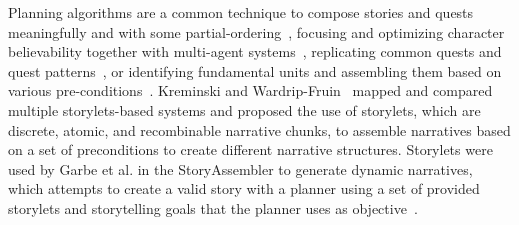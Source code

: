 Planning algorithms are a common technique to compose stories and quests meaningfully and with some partial-ordering~\cite{p8young2013-plansNarrGen,Porteous2017-PlanningTechnologiesIS}, focusing and optimizing character believability together with multi-agent systems~\cite{p8Riedl2005-charBelievMulti,Riedl2006-StoryPlanningCreativity}, replicating common quests and quest patterns~\cite{p8Doran2011-questsMMORPGs,Trenton2010-questpatterns,31-breault2018let}, or identifying fundamental units and assembling them based on various pre-conditions~\cite{p8Kreminski2018-SketchingStorylets,Garbe2019-StoryletsAssembler}. Kreminski and Wardrip-Fruin~\cite{p8Kreminski2018-SketchingStorylets} mapped and compared multiple storylets-based systems and proposed the use of storylets, which are discrete, atomic, and recombinable narrative chunks, to assemble narratives based on a set of preconditions to create different narrative structures. Storylets were used by Garbe et al. in the StoryAssembler to generate dynamic narratives, which attempts to create a valid story with a planner using a set of provided storylets and storytelling goals that the planner uses as objective~\cite{p8Garbe2019-StoryletsAssembler}. 










